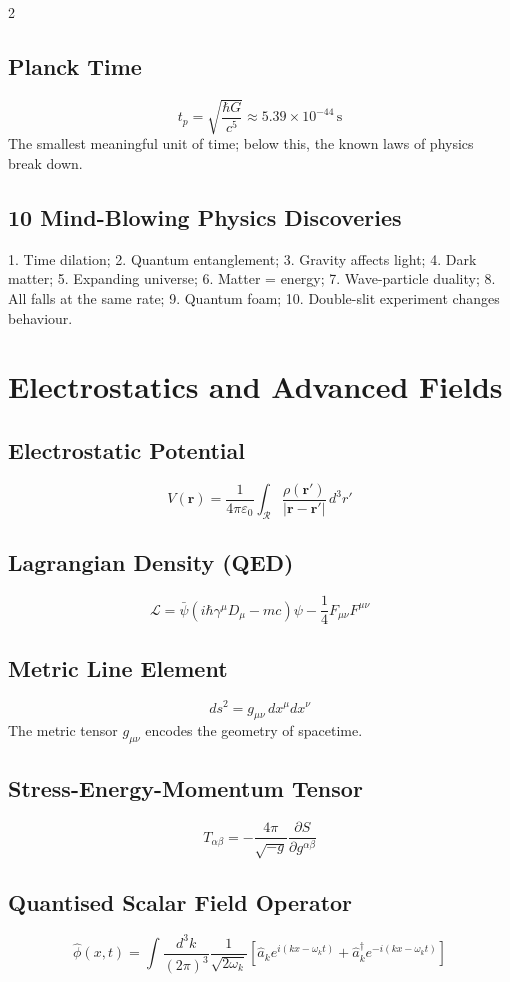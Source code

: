 \documentclass[10pt,a4paper]{article}
\begin{document}
\begin{multicols}{2}
\subsection{Planck Time}
\[
t_p = \sqrt{\frac{\hbar G}{c^5}} \approx 5.39\times 10^{-44}\,\text{s}
\]
The smallest meaningful unit of time; below this, the known laws of physics break down.

\subsection{10 Mind-Blowing Physics Discoveries}
1. Time dilation; 2. Quantum entanglement; 3. Gravity affects light; 4. Dark matter; 5. Expanding universe; 6. Matter = energy; 7. Wave-particle duality; 8. All falls at the same rate; 9. Quantum foam; 10. Double-slit experiment changes behaviour.

\section{Electrostatics and Advanced Fields}

\subsection{Electrostatic Potential}
\[
V(\mathbf{r}) = \frac{1}{4\pi\varepsilon_0}\int_{\mathcal{R}} \frac{\rho(\mathbf{r}')}{|\mathbf{r}-\mathbf{r}'|}\,d^3r'
\]

\subsection{Lagrangian Density (QED)}
\[
\mathcal{L} = \bar\psi(i\hbar\gamma^\mu D_\mu - mc)\psi - \frac{1}{4}F_{\mu\nu}F^{\mu\nu}
\]

\subsection{Metric Line Element}
\[
ds^2 = g_{\mu\nu}\,dx^\mu dx^\nu
\]
The metric tensor $g_{\mu\nu}$ encodes the geometry of spacetime.

\subsection{Stress-Energy-Momentum Tensor}
\[
T_{\alpha\beta} = -\frac{4\pi}{\sqrt{-g}}\frac{\partial S}{\partial g^{\alpha\beta}}
\]

\subsection{Quantised Scalar Field Operator}
\[
\hat\phi(x,t) = \int\frac{d^3k}{(2\pi)^3}\frac{1}{\sqrt{2\omega_k}}\left[\hat{a}_k e^{i(kx-\omega_k t)} + \hat{a}_k^\dagger e^{-i(kx-\omega_k t)}\right]
\]


\end{multicols}
\end{document}

